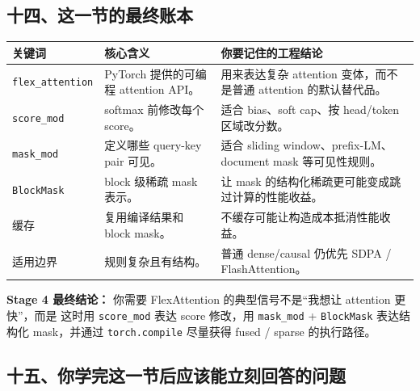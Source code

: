 \subsection{十四、这一节的最终账本}

\begin{center}
{\small
\begin{tabular}{p{3.0cm}p{4.8cm}p{5.0cm}}
\hline
\textbf{关键词} & \textbf{核心含义} & \textbf{你要记住的工程结论} \\
\hline
\texttt{flex\_attention} & PyTorch 提供的可编程 attention API。 & 用来表达复杂 attention 变体，而不是普通 attention 的默认替代品。 \\
\texttt{score\_mod} & softmax 前修改每个 score。 & 适合 bias、soft cap、按 head/token 区域改分数。 \\
\texttt{mask\_mod} & 定义哪些 query-key pair 可见。 & 适合 sliding window、prefix-LM、document mask 等可见性规则。 \\
\texttt{BlockMask} & block 级稀疏 mask 表示。 & 让 mask 的结构化稀疏更可能变成跳过计算的性能收益。 \\
缓存 & 复用编译结果和 block mask。 & 不缓存可能让构造成本抵消性能收益。 \\
适用边界 & 规则复杂且有结构。 & 普通 dense/causal 仍优先 SDPA / FlashAttention。 \\
\hline
\end{tabular}
}
\end{center}

\begin{summarybox}
\textbf{Stage 4 最终结论：} 你需要 FlexAttention 的典型信号不是“我想让 attention 更快”，而是 这时用 \texttt{score\_mod} 表达 score 修改，用 \texttt{mask\_mod} + \texttt{BlockMask} 表达结构化 mask，并通过 \texttt{torch.compile} 尽量获得 fused / sparse 的执行路径。
\end{summarybox}

\subsection{十五、你学完这一节后应该能立刻回答的问题}

